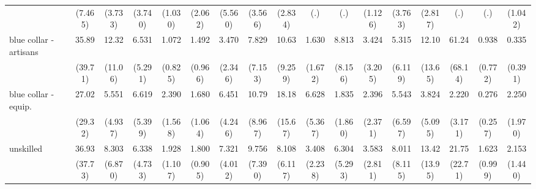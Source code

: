 {\begin{tabular}{l*{16}{c}}
                    &     (7.465)         &     (3.733)         &     (3.740)         &     (1.030)         &     (2.062)         &     (5.560)         &     (3.566)         &     (2.834)         &         (.)         &         (.)         &     (1.126)         &     (3.763)         &     (2.817)         &         (.)         &         (.)         &     (1.042)         \\
[1em]
blue collar - artisans&       35.89\sym{**} &       12.32\sym{**} &       6.531\sym{*}  &       1.072         &       1.492         &       3.470         &       7.829\sym{*}  &       10.63\sym{**} &       1.630         &       8.813\sym{*}  &       3.424         &       5.315         &       12.10\sym{*}  &       61.24\sym{***}&       0.938         &       0.335         \\
                    &     (39.71)         &     (11.06)         &     (5.291)         &     (0.825)         &     (0.966)         &     (2.346)         &     (7.153)         &     (9.259)         &     (1.672)         &     (8.156)         &     (3.205)         &     (6.119)         &     (13.65)         &     (68.14)         &     (0.772)         &     (0.391)         \\
[1em]
blue collar - equip.&       27.02\sym{**} &       5.551         &       6.619\sym{*}  &       2.390         &       1.680         &       6.451\sym{**} &       10.79\sym{**} &       18.18\sym{***}&       6.628\sym{*}  &       1.835         &       2.396         &       5.543         &       3.824         &       2.220         &       0.276         &       2.250         \\
                    &     (29.32)         &     (4.937)         &     (5.399)         &     (1.568)         &     (1.064)         &     (4.246)         &     (8.967)         &     (15.67)         &     (5.367)         &     (1.860)         &     (2.371)         &     (6.597)         &     (5.095)         &     (3.171)         &     (0.257)         &     (1.970)         \\
[1em]
unskilled           &       36.93\sym{***}&       8.303\sym{*}  &       6.338\sym{*}  &       1.928         &       1.800         &       7.321\sym{***}&       9.756\sym{**} &       8.108\sym{**} &       3.408         &       6.304\sym{*}  &       3.583         &       8.011\sym{*}  &       13.42\sym{*}  &       21.75\sym{**} &       1.623         &       2.153         \\
                    &     (37.73)         &     (6.870)         &     (4.733)         &     (1.107)         &     (0.905)         &     (4.012)         &     (7.390)         &     (6.117)         &     (2.238)         &     (5.293)         &     (2.811)         &     (8.115)         &     (13.95)         &     (22.71)         &     (0.999)         &     (1.440)         \\

\end{tabular}}
